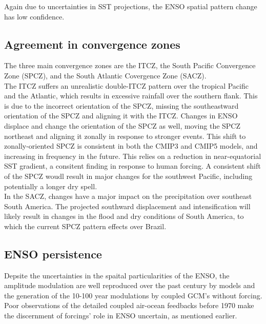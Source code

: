 Again due to uncertainties in SST projections, the ENSO spatial pattern change has low confidence.\\

\subsection{Agreement in convergence zones}

The three main convergence zones are the ITCZ, the South Pacific Convergence Zone (SPCZ), and the South Atlantic Covergence Zone (SACZ).\\

The ITCZ suffers an unrealistic double-ITCZ pattern over the tropical Pacific and the Atlantic, which results in excessive rainfall over the southern flank.
This is due to the incorrect orientation of the SPCZ, missing the southeastward orientation of the SPCZ and aligning it with the ITCZ.
Changes in ENSO displace and change the orientation of the SPCZ as well, moving the SPCZ northeast and aligning it zonally in response to stronger events.
This shift to zonally-oriented SPCZ is consistent in both the CMIP3 and CMIP5 models, and increasing in frequency in the future.
This relies on a reduction in near-equatorial SST gradient, a consitent finding in response to human forcing.
A consistent shift of the SPCZ woudl result in major changes for the southwest Pacific, including potentially a longer dry spell.\\

In the SACZ, changes have a major impact on the precipitation over southeast South America.
The projected southward displacement and intensification will likely result in changes in the flood and dry conditions of South America, to which the current SPCZ pattern effects over Brazil.\\

\subsection{ENSO persistence}

Depsite the uncertainties in the spaital particularities of the ENSO, the amplitude modulation are well reproduced over the past century by models and the generation of the 10-100 year modulations by coupled GCM's without forcing.
Poor observations of the detailed coupled air-ocean feedbacks before 1970 make the discernment of forcings' role in ENSO uncertain, as mentioned earlier.\\

